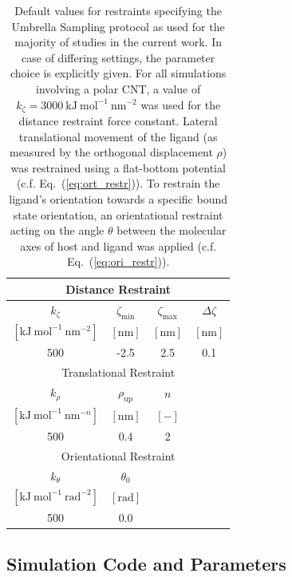 \documentclass[9pt,lessons]{livecoms}
\begin{document}
\begin{table}[ht]
\caption{\label{tbl:restr_1}
Default values for restraints specifying the Umbrella Sampling protocol as used for the majority of studies in the current work. 
In case of differing settings, the parameter choice is explicitly given.
For all simulations involving a polar CNT, a value of $k_\zeta = 3000~\mathrm{kJ~mol^{-1}~nm^{-2}}$ was used for the distance restraint force constant. 
Lateral translational movement of the ligand (as measured by the orthogonal displacement $\rho$) was restrained using a flat-bottom potential (c.f. Eq.~(\ref{eq:ort_restr})).
To restrain the ligand's orientation towards a specific bound state orientation, an orientational restraint acting on the angle $\theta$ between the molecular axes of host and ligand was applied (c.f. Eq.~(\ref{eq:ori_restr})). 
}
\centering
\begin{tabular}{cccc}\hline
\multicolumn{4}{c}{Distance Restraint} \\\hline
$k_\zeta$ & $\zeta_\mathrm{min}$ & $\zeta_\mathrm{max}$ & $\Delta \zeta$ \\
$[\mathrm{kJ~mol}^{-1}~\mathrm{nm}^{-2}]$ & $[\mathrm{nm}]$ & $[\mathrm{nm}]$ & $[\mathrm{nm}]$ \\ 
\hline
500 & -2.5 & 2.5 & 0.1 \\\hline\hline
\multicolumn{4}{c}{Translational Restraint}  \\\hline
$k_\rho$ & $\rho_\mathrm{up}$ & $n$ \\
$[\mathrm{kJ~mol}^{-1}~\mathrm{nm}^{-n}]$ & $[\mathrm{nm}]$ & $[-]$ \\ 
\hline 
500 & 0.4 & 2 \\\hline\hline
\multicolumn{4}{c}{Orientational Restraint}  \\\hline
$k_\theta$ & $\theta_0$ \\
$[\mathrm{kJ~mol}^{-1}~\mathrm{rad}^{-2}]$ & $[\mathrm{rad}]$  \\ 
\hline
500 & 0.0 \\\hline
\end{tabular}
\end{table}


\subsection{Simulation Code and Parameters}
\label{sec:simparam}
\end{document}
